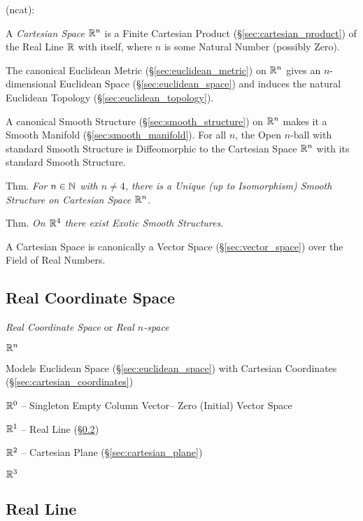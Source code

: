 (ncat):

A \emph{Cartesian Space} $\mathbb{R}^n$ is a Finite Cartesian Product
(\S\ref{sec:cartesian_product}) of the Real Line $\mathbb{R}$ with itself, where
$n$ is some Natural Number (possibly Zero).

The canonical Euclidean Metric (\S\ref{sec:euclidean_metric}) on $\mathbb{R}^n$
gives an $n$-dimensional Euclidean Space (\S\ref{sec:euclidean_space}) and
induces the natural Euclidean Topology (\S\ref{sec:euclidean_topology}).

A canonical Smooth Structure (\S\ref{sec:smooth_structure}) on $\mathbb{R}^n$ makes
it a Smooth Manifold (\S\ref{sec:smooth_manifold}). For all $n$, the Open
$n$-ball with standard Smooth Structure is Diffeomorphic to the Cartesian Space
$\mathbb{R}^n$ with its standard Smooth Structure.

Thm. \emph{For $n \in \mathbb{N}$ with $n \neq 4$, there is a Unique (up to
  Isomorphism) Smooth Structure on Cartesian Space $\mathbb{R}^n$}.

Thm. \emph{On $\mathbb{R}^4$ there exist Exotic Smooth Structures}.

A Cartesian Space is canonically a Vector Space (\S\ref{sec:vector_space}) over
the Field of Real Numbers.



\subsection{Real Coordinate Space}\label{sec:real_coordinate_space}

\emph{Real Coordinate Space} or \emph{Real $n$-space}

$\mathbb{R}^n$

Models Euclidean Space (\S\ref{sec:euclidean_space}) with Cartesian
Coordinates (\S\ref{sec:cartesian_coordinates})

$\mathbb{R}^0$ -- Singleton Empty Column Vector-- Zero (Initial) Vector
Space

$\mathbb{R}^1$ -- Real Line (\S\ref{sec:real_line})

$\mathbb{R}^2$ -- Cartesian Plane (\S\ref{sec:cartesian_plane})

$\mathbb{R}^3$



\subsection{Real Line}\label{sec:real_line}

